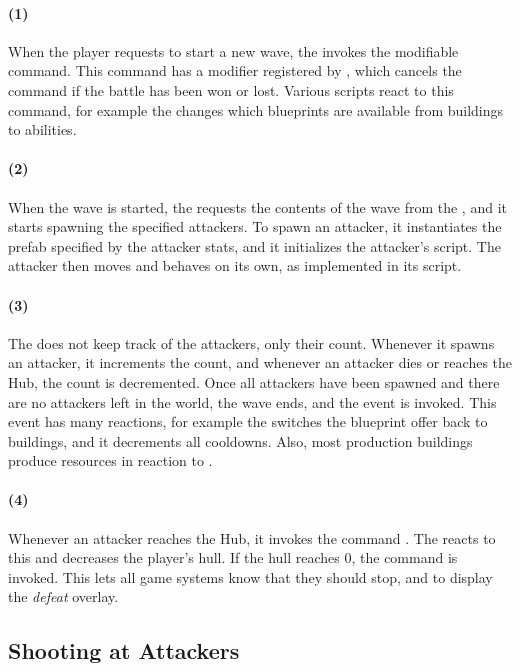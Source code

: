 \paragraph*{(1)}
When the player requests to start a new wave, the  invokes the  modifiable command.
This command has a modifier registered by , which cancels the command if the battle has been won or lost.
Various scripts react to this command, for example the  changes which blueprints are available from buildings to abilities.

\paragraph*{(2)}
When the wave is started, the  requests the contents of the wave from the , and it starts spawning the specified attackers.
To spawn an attacker, it instantiates the prefab specified by the attacker stats, and it initializes the attacker's  script.
The attacker then moves and behaves on its own, as implemented in its  script.

\paragraph*{(3)}
The  does not keep track of the attackers, only their count.
Whenever it spawns an attacker, it increments the count, and whenever an attacker dies or reaches the Hub, the count is decremented.
Once all attackers have been spawned and there are no attackers left in the world, the wave ends, and the  event is invoked.
This event has many reactions, for example the  switches the blueprint offer back to buildings, and it decrements all cooldowns.
Also, most production buildings produce resources in reaction to .

\paragraph*{(4)}
Whenever an attacker reaches the Hub, it invokes the command .
The  reacts to this and decreases the player's hull.
If the hull reaches 0, the command  is invoked.
This lets all game systems know that they should stop, and to display the \emph{defeat} overlay.

\subsection{Shooting at Attackers}

